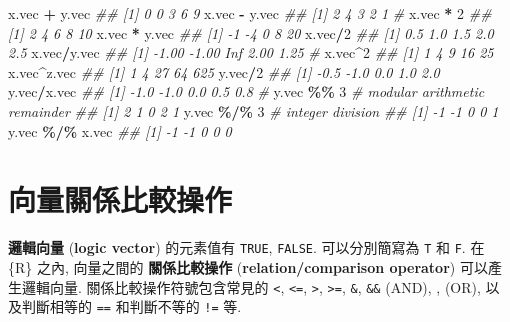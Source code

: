 \documentclass[
]{book}
\newenvironment{Shaded}{\begin{snugshade}}{\end{snugshade}}
\newcommand{\CommentTok}[1]{\textcolor[rgb]{0.56,0.35,0.01}{\textit{#1}}}
\newcommand{\DecValTok}[1]{\textcolor[rgb]{0.00,0.00,0.81}{#1}}
\newcommand{\NormalTok}[1]{#1}
\newcommand{\OperatorTok}[1]{\textcolor[rgb]{0.81,0.36,0.00}{\textbf{#1}}}
\newcommand{\StringTok}[1]{\textcolor[rgb]{0.31,0.60,0.02}{#1}}
\begin{document}
\begin{Shaded}
\begin{Highlighting}[]
\NormalTok{x.vec }\OperatorTok{+}\StringTok{ }\NormalTok{y.vec}
\CommentTok{\#\# [1] 0 0 3 6 9}
\NormalTok{x.vec }\OperatorTok{{-}}\StringTok{ }\NormalTok{y.vec}
\CommentTok{\#\# [1] 2 4 3 2 1}
\CommentTok{\#}
\NormalTok{x.vec }\OperatorTok{*}\StringTok{ }\DecValTok{2}
\CommentTok{\#\# [1]  2  4  6  8 10}
\NormalTok{x.vec }\OperatorTok{*}\StringTok{ }\NormalTok{y.vec}
\CommentTok{\#\# [1] {-}1 {-}4  0  8 20}
\NormalTok{x.vec}\OperatorTok{/}\DecValTok{2}
\CommentTok{\#\# [1] 0.5 1.0 1.5 2.0 2.5}
\NormalTok{x.vec}\OperatorTok{/}\NormalTok{y.vec}
\CommentTok{\#\# [1] {-}1.00 {-}1.00   Inf  2.00  1.25}
\CommentTok{\#}
\NormalTok{x.vec}\OperatorTok{\^{}}\DecValTok{2}
\CommentTok{\#\# [1]  1  4  9 16 25}
\NormalTok{x.vec}\OperatorTok{\^{}}\NormalTok{z.vec}
\CommentTok{\#\# [1]   1   4  27  64 625}
\NormalTok{y.vec}\OperatorTok{/}\DecValTok{2}
\CommentTok{\#\# [1] {-}0.5 {-}1.0  0.0  1.0  2.0}
\NormalTok{y.vec}\OperatorTok{/}\NormalTok{x.vec}
\CommentTok{\#\# [1] {-}1.0 {-}1.0  0.0  0.5  0.8}
\CommentTok{\#}
\NormalTok{y.vec }\OperatorTok{\%\%}\StringTok{ }\DecValTok{3}  \CommentTok{\# modular arithmetic remainder}
\CommentTok{\#\# [1] 2 1 0 2 1}
\NormalTok{y.vec }\OperatorTok{\%/\%}\StringTok{ }\DecValTok{3}   \CommentTok{\# integer division}
\CommentTok{\#\# [1] {-}1 {-}1  0  0  1}
\NormalTok{y.vec }\OperatorTok{\%/\%}\StringTok{ }\NormalTok{x.vec}
\CommentTok{\#\# [1] {-}1 {-}1  0  0  0}
\end{Highlighting}
\end{Shaded}

\hypertarget{ux5411ux91cfux95dcux4fc2ux6bd4ux8f03ux64cdux4f5c}{%
\section{向量關係比較操作}\label{ux5411ux91cfux95dcux4fc2ux6bd4ux8f03ux64cdux4f5c}}

\textbf{邏輯向量}
(\textbf{logic vector})
的元素值有
\texttt{TRUE},
\texttt{FALSE}.
可以分別簡寫為
\texttt{T} 和
\texttt{F}.
在 \{R\} 之內, 向量之間的
\textbf{關係比較操作}
(\textbf{relation/comparison operator})
可以產生邏輯向量.
關係比較操作符號包含常見的
\texttt{\textless{}},
\texttt{\textless{}=},
\texttt{\textgreater{}},
\texttt{\textgreater{}=},
\texttt{\&}, \texttt{\&\&} (AND), \texttt{\textbar{}} , \texttt{\textbar{}\textbar{}} (OR),
以及判斷相等的
\texttt{==} 和判斷不等的
\texttt{!=} 等.
\end{document}
